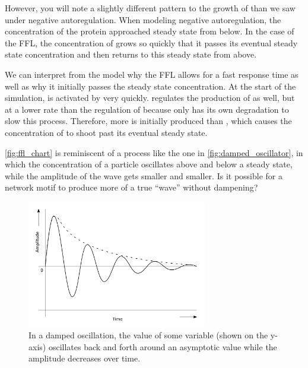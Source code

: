 However, you will note a slightly different pattern to the growth of  than we saw under negative autoregulation. When modeling negative autoregulation, the concentration of the protein approached steady state from below. In the case of the FFL, the concentration of  grows so quickly that it passes its eventual steady state concentration and then returns to this steady state from above.

We can interpret from the model why the FFL allows for a fast response time as well as why it initially passes the steady state concentration. At the start of the simulation,  is activated by  very quickly.  regulates the production of  as well, but at a lower rate than the regulation of  because  only has its own degradation to slow this process. Therefore, more  is initially produced than , which causes the concentration of  to shoot past its eventual steady state.

\autoref{fig:ffl_chart} is reminiscent of a  process like the one in \autoref{fig:damped_oscillator}, in which the concentration of a particle oscillates above and below a steady state, while the amplitude of the wave gets smaller and smaller. Is it possible for a network motif to produce more of a true ``wave'' without dampening?\\

\begin{figure}[h]
\centering
\mySfFamily
\includegraphics[width = 0.7\textwidth]{../images/damped_oscillator.png}
\caption{In a damped oscillation, the value of some variable (shown on the y-axis) oscillates back and forth around an asymptotic value while the amplitude decreases over time.}
\label{fig:damped_oscillator}
\end{figure}

